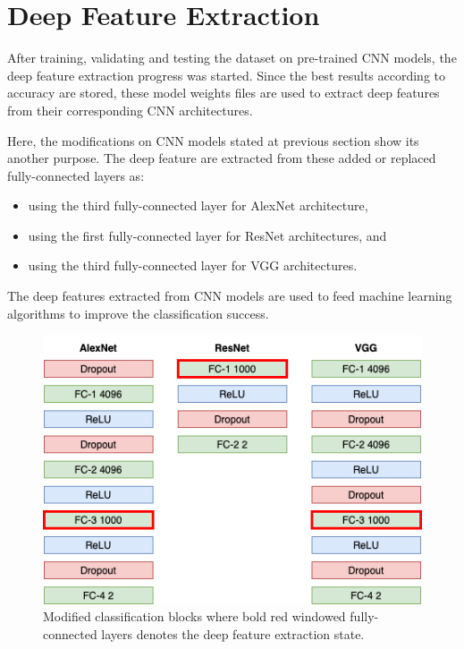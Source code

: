 \section{Deep Feature Extraction}

After training, validating and testing the dataset on pre-trained CNN models, the deep feature extraction progress was started. Since the best results according to accuracy are stored, these model weights files are used to extract deep features from their corresponding CNN architectures.

Here, the modifications on CNN models stated at previous section show its another purpose. The deep feature are extracted from these added or replaced fully-connected layers as:

\begin{itemize}
    \item using the third fully-connected layer for AlexNet architecture,
    \item using the first fully-connected layer for ResNet architectures, and
    \item using the third fully-connected layer for VGG architectures.
\end{itemize}

The deep features extracted from CNN models are used to feed machine learning algorithms to improve the classification success.

\begin{figure}[h]
    \centering
    \includegraphics[width=.8\linewidth]{fig/modified_classification_blocks.png}
    \vspace{2mm}
    \caption{Modified classification blocks where bold red windowed fully-connected layers denotes the deep feature extraction state.}
    \label{fig:modified_classification_blocks}
\end{figure}

